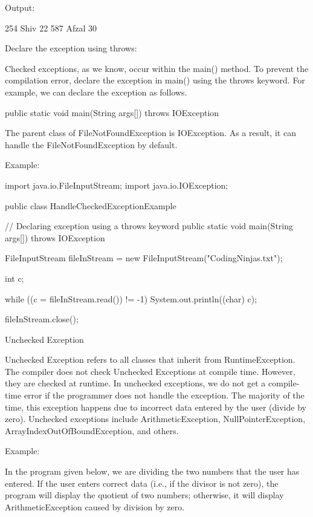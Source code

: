 {Output:
 

254 Shiv 22
587 Afzal 30
 

 

Declare the exception using throws:
 

Checked exceptions, as we know, occur within the main() method. To prevent the compilation error, declare the exception in main() using the throws keyword. For example, we can declare the exception as follows.

 

public static void main(String args[]) throws IOException
{

}
 

The parent class of FileNotFoundException is IOException. As a result, it can handle the FileNotFoundException by default.


Example:
 

import java.io.FileInputStream;
import java.io.IOException;

public class HandleCheckedExceptionExample {

    // Declaring exception using a throws keyword
    public static void main(String args[]) throws IOException {

        FileInputStream fileInStream = new FileInputStream("CodingNinjas.txt");

        int c;

        while ((c = fileInStream.read()) != -1) {
            System.out.println((char) c);
        }

        fileInStream.close();
    }
}
 

 
Unchecked Exception
 

Unchecked Exception refers to all classes that inherit from RuntimeException. The compiler does not check Unchecked Exceptions at compile time. However, they are checked at runtime. In unchecked exceptions, we do not get a compile-time error if the programmer does not handle the exception. The majority of the time, this exception happens due to incorrect data entered by the user (divide by zero). Unchecked exceptions include ArithmeticException, NullPointerException, ArrayIndexOutOfBoundException, and others.

 

Example:
 

In the program given below, we are dividing the two numbers that the user has entered. If the user enters correct data (i.e., if the divisor is not zero), the program will display the quotient of two numbers; otherwise, it will display ArithmeticException caused by division by zero.

}

